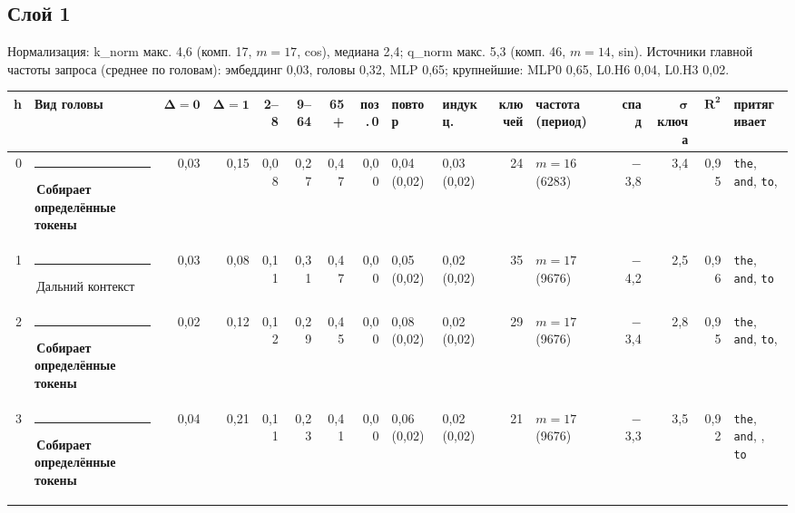 \documentclass[10pt]{article}
\begin{document}
\par\vspace{0.4em}
\noindent\begin{minipage}{\linewidth}
\subsection*{Слой 1}
{\small\color{ink2} Нормализация: k\_norm макс. 4,6 (комп. 17, $m{=}17$, cos), медиана 2,4; q\_norm макс. 5,3 (комп. 46, $m{=}14$, sin). Источники главной частоты запроса (среднее по головам): эмбеддинг 0,03, головы 0,32, MLP 0,65; крупнейшие: MLP0 0,65, L0.H6 0,04, L0.H3 0,02.}
\begin{center}{\footnotesize\begin{tabular}{|r|l|r|r|r|r|r|r|l|l|r|l|r|r|r|l|}
\hline
\rowcolor{head}\textbf{h} & \textbf{Вид головы} & $\boldsymbol{\Delta{=}0}$ & $\boldsymbol{\Delta{=}1}$ & \textbf{2–8} & \textbf{9–64} & \textbf{65+} & \textbf{поз.\,0} & \textbf{повтор} & \textbf{индукц.} & \textbf{ключей} & \textbf{частота (период)} & \textbf{спад} & $\boldsymbol{\sigma}$ \textbf{ключа} & $\boldsymbol{R^2}$ & \textbf{притягивает} \\ \hline
0 & \textcolor[HTML]{6250D6}{\rule{0.62em}{0.62em}}\,\textbf{Собирает определённые токены} & 0,03 & 0,15 & 0,08 & 0,27 & 0,47 & 0,00 & 0,04 (0,02) & 0,03 (0,02) & 24 & $m{=}16$ (6283) & $-$3,8 & 3,4 & 0,95 & \texttt{\textvisiblespace{}the}, \texttt{\textvisiblespace{}and}, \texttt{\textvisiblespace{}to}, \texttt{\textvisiblespace{}} \\ \hline
1 & \textcolor[HTML]{C3C2B7}{\rule{0.62em}{0.62em}}\,Дальний контекст & 0,03 & 0,08 & 0,11 & 0,31 & 0,47 & 0,00 & 0,05 (0,02) & 0,02 (0,02) & 35 & $m{=}17$ (9676) & $-$4,2 & 2,5 & 0,96 & \texttt{\textvisiblespace{}the}, \texttt{\textvisiblespace{}and}, \texttt{\textvisiblespace{}to} \\ \hline
2 & \textcolor[HTML]{6250D6}{\rule{0.62em}{0.62em}}\,\textbf{Собирает определённые токены} & 0,02 & 0,12 & 0,12 & 0,29 & 0,45 & 0,00 & 0,08 (0,02) & 0,02 (0,02) & 29 & $m{=}17$ (9676) & $-$3,4 & 2,8 & 0,95 & \texttt{\textvisiblespace{}the}, \texttt{\textvisiblespace{}and}, \texttt{\textvisiblespace{}to}, \texttt{\textvisiblespace{}} \\ \hline
3 & \textcolor[HTML]{6250D6}{\rule{0.62em}{0.62em}}\,\textbf{Собирает определённые токены} & 0,04 & 0,21 & 0,11 & 0,23 & 0,41 & 0,00 & 0,06 (0,02) & 0,02 (0,02) & 21 & $m{=}17$ (9676) & $-$3,3 & 3,5 & 0,92 & \texttt{\textvisiblespace{}the}, \texttt{\textvisiblespace{}and}, \texttt{\textvisiblespace{}}, \texttt{\textvisiblespace{}to} \\ \hline

\end{tabular}}
\end{center}
\end{minipage}
\end{document}
